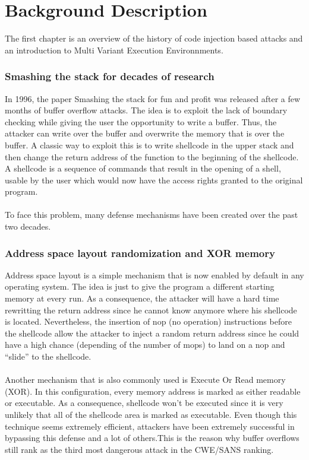 \documentclass[english]{enstaPRE}
\begin{document}
\part{Background Description}
The first chapter is an overview of the history of code injection based attacks and an introduction to Multi Variant Execution Environnments.

\section{Smashing the stack for decades of research}
In 1996, the paper Smashing the stack for fun and profit \cite{smashing} was released after a few months of buffer overflow attacks.
The idea is to exploit the lack of boundary checking while giving the user the opportunity to write a buffer.
Thus, the attacker can write over the buffer and overwrite the memory that is over the buffer. 
A classic way to exploit this is to write shellcode in the upper stack and then change the return address of the function
to the beginning of the shellcode. A shellcode is a sequence of commands that result in the opening of a shell, usable by the user which
would now have the access rights granted to the original program.\\
 \\

To face this problem, many defense mechanisms have been created over the past two decades.

\section{Address space layout randomization and XOR memory}
Address space layout is a simple mechanism that is now enabled by default in any operating system. The idea is just to give the 
program a different starting memory at every run. As a consequence, the attacker will have a hard time rewritting the return address since
he cannot know anymore where his shellcode is located. 
Nevertheless, the insertion of nop (no operation) instructions before the shellcode allow the attacker to inject a random 
return address since he could have a high chance (depending of the number of mops) to land on a nop and ``slide'' to the shellcode.
\\ \\
Another mechanism that is also commonly used is Execute Or Read memory (XOR). In this configuration, every memory address is marked
as either readable or executable. As a consequence, shellcode won't be executed since it is very unlikely that all of the shellcode
area is marked as executable.
Even though this technique seems extremely efficient, attackers have been extremely successful in bypassing this defense 
and a lot of others.This is the reason why buffer overflows still rank as the third most dangerous attack in the CWE/SANS ranking.\\
 \\
\end{document}
